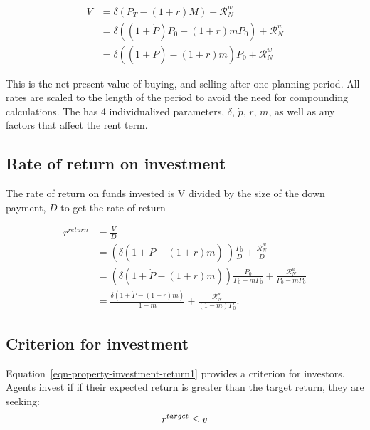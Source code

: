 \begin{align}
V &= \delta \left(P_T - (1+r)M\right) +   \mathcal{R}^w_N   \\
&= \delta \left((1+\dot P) P_0 - (1+r)mP_0\right)  +      \mathcal{R}^w_N \\
  &= \delta \left((1+\dot P)    - (1+r)m    \right) P_0 + \mathcal{R}^w_N 
\end{align}

This is the net present value of buying, and selling after one planning period. All rates are scaled to the length of the period to avoid the need for compounding calculations. The has 4 individualized  parameters, $\delta$, $\dot p$, $r$, $m$, as well as any factors that affect the rent term.



\subsection{Rate of return on investment}
The rate of return on funds invested is V divided by the size of the down payment, $D$ to get the rate of return  

\begin{align}
r^{return} 
  &= \frac{V}{D}  \nonumber \\
  &= \left(\delta \left(1+\dot P - (1+r)m\right) \ \right) \frac{P_0}{D}  + \frac{\mathcal{R}^w_N }{D}      \nonumber \\
  &= \left(\delta \left(1+\dot P - (1+r)m\right)  \right) \frac{P_0}{P_0-mP_0} +  \frac{\mathcal{R}^w_N }{P_0-mP_0}  \\ 
  &= \frac{\delta \left(1+\dot P - (1+r)m\right) }{1-m} +\frac{\mathcal{R}^w_N }{(1-m)P_0}.
\label{eqn-property-investment-return1}
\end{align}

\subsection{Criterion for investment}
Equation~\ref{eqn-property-investment-return1} provides a criterion for investors. Agents invest if if their expected return is greater than the target return, they are seeking:
\begin{equation}\Large
r^{target}\le v 
\label{eqn-property-investment-return2}
\end{equation}


